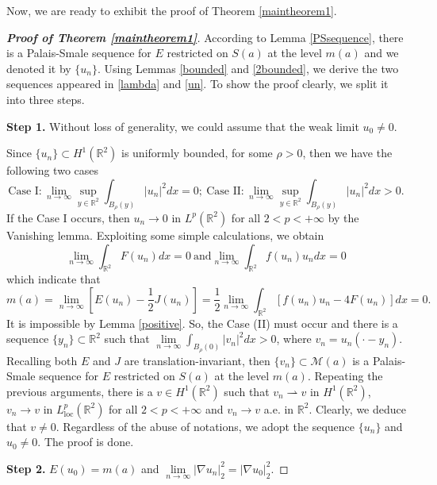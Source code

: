 \documentclass[11pt]{amsart}
\numberwithin{equation}{section}
\theoremstyle{definition}
\newcommand{\R}{\mathbb{R}}
\begin{document}
Now, we are ready to exhibit the proof of Theorem \ref{maintheorem1}.


\begin{proof}[\emph{\textbf{Proof of Theorem \ref{maintheorem1}}}]
According to Lemma \ref{PSsequence},
there is a Palais-Smale sequence for $E$ restricted on $S(a)$
at the level $m(a)$ and we denoted it by $\{u_n\}$. Using Lemmas \ref{bounded}
and \ref{2bounded}, we derive the two sequences appeared in \eqref{lambda}
and \eqref{un}. To show the proof clearly, we split it into three steps.

\textbf{Step 1.} Without loss of generality, we could assume that the weak limit $u_0\neq0$.

Since $\{u_n\}\subset H^1(\R^2)$ is uniformly bounded, for some $\rho>0$, then we have the following two cases
\[
\text{Case I}: \lim_{n\to\infty}\sup_{y\in\R^2}\int_{B_\rho(y)}|u_n|^2dx=0;~
\text{Case II}: \lim_{n\to\infty}\sup_{y\in\R^2}\int_{B_\rho(y)}|u_n|^2dx>0.
\]
If the Case I occurs, then $u_n\to0$ in $L^p(\R^2)$ for all $2<p<+\infty$ by the Vanishing lemma.
Exploiting some simple calculations, we obtain
\[
\lim_{n\to\infty}\int_{\R^{2}} F(u_n) dx=0~\text{and}\lim_{n\to\infty}\int_{\R^{2}}f(u_n)u_n dx=0
\]
which indicate that
\[
m(a)=\lim_{n\to\infty}[E(u_n)-\frac12J(u_n)]= \frac{1}{2}\lim_{n\to\infty}\int_{\R^{2}}\left[f(u_n)u_n-4 F(u_n)\right]dx=0.
\]
It is impossible by Lemma \ref{positive}. So, the Case (II) must occur and there is a sequence $\{y_n\}\subset\R^2$
such that $\lim\limits_{n\to\infty}\int_{B_\rho(0)}|v_n|^2dx>0$, where $v_n=u_n(\cdot-y_n)$.
Recalling both $E$ and $J$ are translation-invariant, then $\{v_n\}\subset \mathcal{M}(a)$ is a Palais-Smale sequence for $E$ restricted on $S(a)$
at the level $m(a)$. Repeating the previous arguments, there is a $v\in H^1(\R^2)$ such that
$v_n\rightharpoonup v$ in $H^1(\R^2)$, $v_n\to v$ in $L_{\text{loc}}^p(\R^2)$ for all $2<p<+\infty$ and $v_n\to v$
a.e. in $\R^2$. Clearly, we deduce that $v\neq0$. Regardless of the abuse of notations,
we adopt the sequence $\{u_n\}$ and $u_0\neq0$. The proof is done.

\textbf{Step 2.} $E(u_0)=m(a)$ and $\lim\limits_{n\to\infty}|\nabla u_n|_2^2=|\nabla u_0|_2^2$.


\end{proof}
\end{document}
